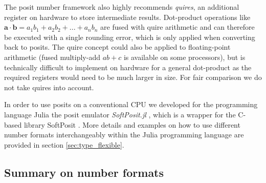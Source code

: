 The posit number framework also highly recommends \emph{quires}, an additional register on hardware to store intermediate results.
Dot-product operations like $\mathbf{a} \cdot \mathbf{b} = a_1b_1 + a_2b_2 + ... + a_nb_n$ are fused with quire arithmetic and can
therefore be executed with a single rounding error, which is only applied when converting back to posits. The quire concept could also
be applied to floating-point arithmetic (fused multiply-add $ab + c$ is available on some processors), but is technically difficult to implement on
hardware for a general dot-product as the required registers would need to be much larger in size. For fair comparison we do not take quires into account. 

In order to use posits on a conventional CPU we developed for the programming language Julia \citep{Bezanson2017} the posit
emulator \emph{SoftPosit.jl} \citep{Klower2019}, which is a wrapper for the C-based library SoftPosit \citep{Leong2020}. More details
and examples on how to use different number formats interchangeably within the Julia programming language are provided in
section \ref{sec:type_flexible}.

\subsection{Summary on number formats}
\label{sec:summary_formats}


